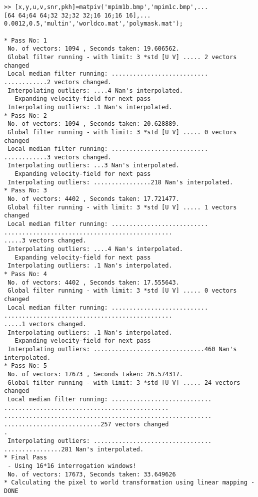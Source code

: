 \documentclass{book}
\begin{document}
\begin{verbatim}
>> [x,y,u,v,snr,pkh]=matpiv('mpim1b.bmp','mpim1c.bmp',...
[64 64;64 64;32 32;32 32;16 16;16 16],...
0.0012,0.5,'multin','worldco.mat','polymask.mat');  

* Pass No: 1
 No. of vectors: 1094 , Seconds taken: 19.606562.
 Global filter running - with limit: 3 *std [U V] ..... 2 vectors changed
 Local median filter running: ...........................
............2 vectors changed.
 Interpolating outliers: ....4 Nan's interpolated.
   Expanding velocity-field for next pass
 Interpolating outliers: .1 Nan's interpolated.
* Pass No: 2
 No. of vectors: 1094 , Seconds taken: 20.628889.
 Global filter running - with limit: 3 *std [U V] ..... 0 vectors changed
 Local median filter running: ...........................
............3 vectors changed.
 Interpolating outliers: ...3 Nan's interpolated.
   Expanding velocity-field for next pass
 Interpolating outliers: ................218 Nan's interpolated.
* Pass No: 3
 No. of vectors: 4402 , Seconds taken: 17.721477.
 Global filter running - with limit: 3 *std [U V] ..... 1 vectors changed
 Local median filter running: ...........................
...............................................
.....3 vectors changed.
 Interpolating outliers: ....4 Nan's interpolated.
   Expanding velocity-field for next pass
 Interpolating outliers: .1 Nan's interpolated.
* Pass No: 4
 No. of vectors: 4402 , Seconds taken: 17.555643.
 Global filter running - with limit: 3 *std [U V] ..... 0 vectors changed
 Local median filter running: ...........................
...............................................
.....1 vectors changed.
 Interpolating outliers: .1 Nan's interpolated.
   Expanding velocity-field for next pass
 Interpolating outliers: ...............................460 Nan's interpolated.
* Pass No: 5
 No. of vectors: 17673 , Seconds taken: 26.574317.
 Global filter running - with limit: 3 *std [U V] ..... 24 vectors changed
 Local median filter running: ............................
..............................................
..........................................................
...........................257 vectors changed
.
 Interpolating outliers: .................................
................281 Nan's interpolated.
* Final Pass
 - Using 16*16 interrogation windows! 
 No. of vectors: 17673, Seconds taken: 33.649626 
* Calculating the pixel to world transformation using linear mapping - DONE

\end{verbatim}
\end{document}
